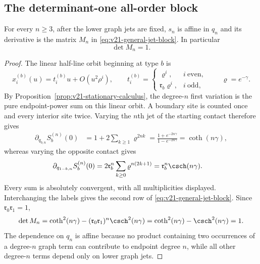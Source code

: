 \subsection{The determinant-one all-order block}

\begin{proposition}
\label{prop:v21-last-jet-block}
For every $n\ge3$, after the lower graph jets are fixed, $s_n$ is affine in
$q_n$ and its derivative is the matrix $M_n$ in
\eqref{eq:v21-general-jet-block}.  In particular
\begin{equation}\label{eq:v21-last-jet-det}
                         \det M_n=1.
\end{equation}
\end{proposition}

\begin{proof}
The linear half-line orbit beginning at type $b$ is
\begin{equation}\label{eq:v21-linear-orbit}
 x_i^{(b)}(u)=t_i^{(b)}u+O(u^2\rho^i),
 \qquad
 t_i^{(b)}=
 \begin{cases}
 \varrho^i,&i\ \mathrm{even},\\
 \mathfrak r_b\varrho^i,&i\ \mathrm{odd},
 \end{cases}
 \qquad \varrho=e^{-\gamma}.
\end{equation}
By Proposition~\ref{prop:v21-stationary-calculus}, the degree-$n$ first
variation is the pure endpoint-power sum on this linear orbit.  A boundary
site is counted once and every interior site twice.  Varying the $n$th jet of
the starting contact therefore gives
\begin{align}
 \partial_{q_{b,n}}S_b^{(n)}(0)
 &=1+2\sum_{k\ge1}\varrho^{2nk}
   =\frac{1+e^{-2n\gamma}}{1-e^{-2n\gamma}}
   =\coth(n\gamma),                         \label{eq:v21-own-sum}
\end{align}
whereas varying the opposite contact gives
\begin{align}
 \partial_{q_{1-b,n}}S_b^{(n)}(0)
 &=2\mathfrak r_b^n\sum_{k\ge0}
     \varrho^{n(2k+1)}
   =\mathfrak r_b^n\csch(n\gamma).          \label{eq:v21-cross-sum}
\end{align}
Every sum is absolutely convergent, with all multiplicities displayed.
Interchanging the labels gives the second row of
\eqref{eq:v21-general-jet-block}.  Since
$\mathfrak r_0\mathfrak r_1=1$,
\[
 \det M_n
 =\coth^2(n\gamma)
  -(\mathfrak r_0\mathfrak r_1)^n\csch^2(n\gamma)
 =\coth^2(n\gamma)-\csch^2(n\gamma)=1.
\]
The dependence on $q_n$ is affine because no product containing two
occurrences of a degree-$n$ graph term can contribute to endpoint degree
$n$, while all other degree-$n$ terms depend only on lower graph jets.
\end{proof}

